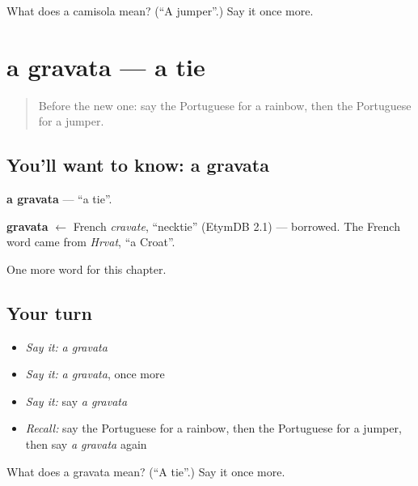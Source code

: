 \begin{tcolorbox}[breakable,colback=teal!4,colframe=teal!35!black,title={Before you move on}]
What does a camisola mean? (\textquotedblleft{}A jumper\textquotedblright{}.) Say it once more.
\end{tcolorbox}
\section[a gravata]{a gravata — a tie}

\label{lesson:PT-C103-gravata}



\begin{quote}
Before the new one: say the Portuguese for a rainbow, then the Portuguese for a jumper.
\end{quote}

\subsection*{You'll want to know: a gravata}
\textbf{a gravata} — \textquotedblleft{}a tie\textquotedblright{}.

\begin{cousinweb}
\textbf{gravata} $\leftarrow$ French \emph{cravate}, \textquotedblleft{}necktie\textquotedblright{} (EtymDB 2.1) — borrowed. The French word came from \emph{Hrvat}, \textquotedblleft{}a Croat\textquotedblright{}.
\end{cousinweb}

\begin{grammarlens}[title={What you've built}]
One more word for this chapter.
\end{grammarlens}

\subsection*{Your turn}
\begin{itemize}
\raggedright
  \item \emph{Say it:} \emph{a gravata}
  \item \emph{Say it:} \emph{a gravata}, once more
  \item \emph{Say it:} say \emph{a gravata}
  \item \emph{Recall:} say the Portuguese for a rainbow, then the Portuguese for a jumper, then say \emph{a gravata} again
\end{itemize}

\begin{tcolorbox}[breakable,colback=teal!4,colframe=teal!35!black,title={Before you move on}]
What does a gravata mean? (\textquotedblleft{}A tie\textquotedblright{}.) Say it once more.
\end{tcolorbox}
